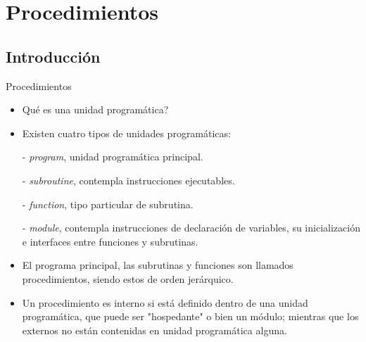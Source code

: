 
\section{Procedimientos}  



\subsection{Introducción}

\begin{frame}[fragile]{Procedimientos}
 \begin{itemize}[<+(0)->]
 \item Qué es una unidad programática?
 \item Existen cuatro tipos de unidades programáticas:
 \item [-]\emph{program}, unidad programática principal.
 \item [-]\emph{subroutine}, contempla instrucciones ejecutables.
 \item [-]\emph{function}, tipo particular de subrutina.
 \item [-]\emph{module}, contempla instrucciones de declaración de variables, su inicialización e interfaces entre funciones y subrutinas.
 \item El programa principal, las subrutinas y funciones son llamados procedimientos, siendo estos de orden jerárquico.
 \item Un procedimiento es interno si está definido dentro de una unidad programática, que puede ser "hospedante" o bien un módulo; mientras que los externos no están contenidas en unidad programática alguna.
 \end{itemize}
\end{frame} 